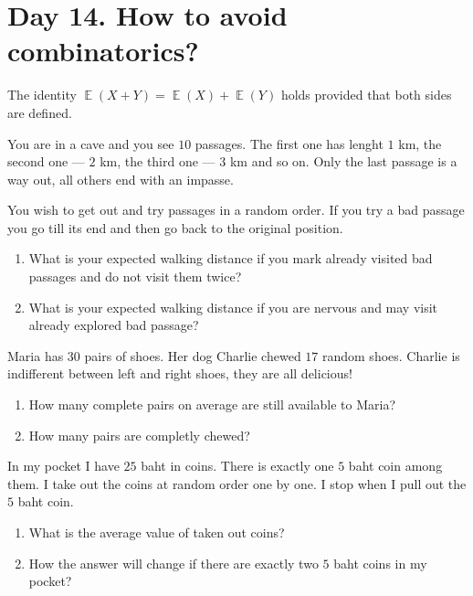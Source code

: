 \documentclass[12pt]{article}
\DeclareMathOperator{\E}{\mathbb{E}}
\begin{document}
\section{Day 14. How to avoid combinatorics?}

\begin{theorem}
    The identity $\E(X + Y) = \E(X) + \E(Y)$ holds provided that both sides are defined. 
\end{theorem}

\begin{exercise}
You are in a cave and you see $10$ passages. 
The first one has lenght $1$ km, the second one — $2$ km, the third one — $3$ km and so on. 
Only the last passage is a way out, all others end with an impasse. 

You wish to get out and try passages in a random order. 
If you try a bad passage you go till its end and then go back to the original position.
\begin{enumerate}[label=\alph*)]
    \item What is your expected walking distance if you mark already visited bad passages and do not visit them twice?
    \item What is your expected walking distance if you are nervous and may visit already explored bad passage?
\end{enumerate}
\end{exercise}


\begin{exercise}

Maria has $30$ pairs of shoes. Her dog Charlie chewed $17$ random shoes. 
Charlie is indifferent between left and right shoes, they are all delicious!

\begin{enumerate}[label=\alph*)]
  \item How many complete pairs on average are still available to Maria?
  \item How many pairs are completly chewed?
\end{enumerate}

\end{exercise}

\begin{exercise}
In my pocket I have $25$ baht in coins. 
There is exactly one $5$ baht coin among them. 
I take out the coins at random order one by one. 
I stop when I pull out the $5$ baht coin. 

\begin{enumerate}[label=\alph*)]
  \item What is the average value of taken out coins?
  \item How the answer will change if there are exactly two $5$ baht coins in my pocket?
\end{enumerate}
\end{exercise}
\end{document}
